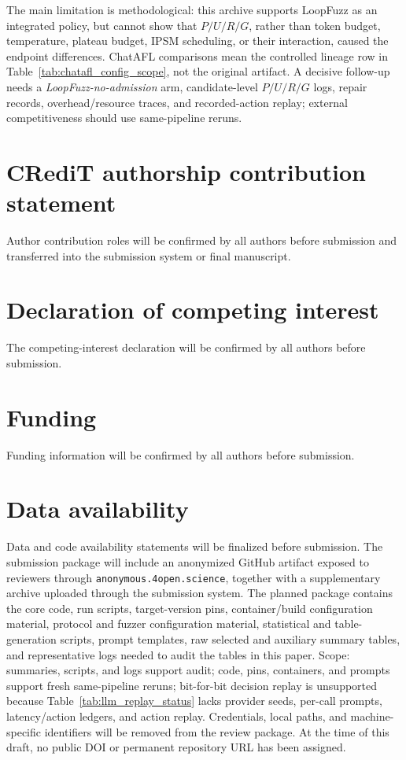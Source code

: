 \documentclass[final,5p,times,number]{elsarticle}
\begin{document}
The main limitation is methodological: this archive supports LoopFuzz as an integrated policy, but cannot show that $P/U/R/G$, rather than token budget, temperature, plateau budget, IPSM scheduling, or their interaction, caused the endpoint differences. ChatAFL comparisons mean the controlled lineage row in Table~\ref{tab:chatafl_config_scope}, not the original artifact. A decisive follow-up needs a \emph{LoopFuzz-no-admission} arm, candidate-level $P/U/R/G$ logs, repair records, overhead/resource traces, and recorded-action replay; external competitiveness should use same-pipeline reruns.

\section*{CRediT authorship contribution statement}
Author contribution roles will be confirmed by all authors before submission and transferred into the submission system or final manuscript.

\section*{Declaration of competing interest}
The competing-interest declaration will be confirmed by all authors before submission.

\section*{Funding}
Funding information will be confirmed by all authors before submission.

\section*{Data availability}
Data and code availability statements will be finalized before submission. The submission package will include an anonymized GitHub artifact exposed to reviewers through \texttt{anonymous.4open.science}, together with a supplementary archive uploaded through the submission system. The planned package contains the core code, run scripts, target-version pins, container/build configuration material, protocol and fuzzer configuration material, statistical and table-generation scripts, prompt templates, raw selected and auxiliary summary tables, and representative logs needed to audit the tables in this paper. Scope: summaries, scripts, and logs support audit; code, pins, containers, and prompts support fresh same-pipeline reruns; bit-for-bit decision replay is unsupported because Table~\ref{tab:llm_replay_status} lacks provider seeds, per-call prompts, latency/action ledgers, and action replay. Credentials, local paths, and machine-specific identifiers will be removed from the review package. At the time of this draft, no public DOI or permanent repository URL has been assigned.
\end{document}
